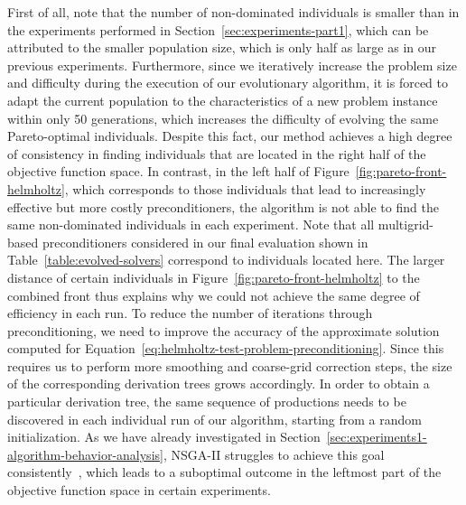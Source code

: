 First of all, note that the number of non-dominated individuals is smaller than in the experiments performed in Section~\ref{sec:experiments-part1}, which can be attributed to the smaller population size, which is only half as large as in our previous experiments.
Furthermore, since we iteratively increase the problem size and difficulty during the execution of our evolutionary algorithm, it is forced to adapt the current population to the characteristics of a new problem instance within only 50 generations, which increases the difficulty of evolving the same Pareto-optimal individuals.
Despite this fact, our method achieves a high degree of consistency in finding individuals that are located in the right half of the objective function space.
In contrast, in the left half of Figure~\ref{fig:pareto-front-helmholtz}, which corresponds to those individuals that lead to increasingly effective but more costly preconditioners, the algorithm is not able to find the same non-dominated individuals in each experiment.
Note that all multigrid-based preconditioners considered in our final evaluation shown in Table~\ref{table:evolved-solvers} correspond to individuals located here.
The larger distance of certain individuals in Figure~\ref{fig:pareto-front-helmholtz} to the combined front thus explains why we could not achieve the same degree of efficiency in each run.
To reduce the number of iterations through preconditioning, we need to improve the accuracy of the approximate solution computed for Equation~\eqref{eq:helmholtz-test-problem-preconditioning}.
Since this requires us to perform more smoothing and coarse-grid correction steps, the size of the corresponding derivation trees grows accordingly.
In order to obtain a particular derivation tree, the same sequence of productions needs to be discovered in each individual run of our algorithm, starting from a random initialization.
As we have already investigated in Section~\ref{sec:experiments1-algorithm-behavior-analysis}, NSGA-II struggles to achieve this goal consistently~\cite{liu2022evolvability}, which leads to a suboptimal outcome in the leftmost part of the objective function space in certain experiments.
